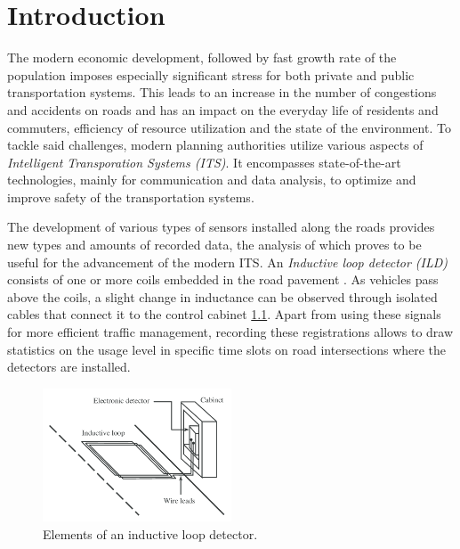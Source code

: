 
\chapter{Introduction}

The modern economic development, followed by fast growth rate of the population
imposes especially significant stress for both private and public transportation
systems. This leads to an increase in the number of congestions and accidents 
on roads and has an impact on the everyday life of residents and commuters,
efficiency of resource utilization and the state of the environment. To tackle
said challenges, modern planning authorities utilize various aspects of
\textit{Intelligent Transporation Systems (ITS)}. It encompasses
state-of-the-art technologies, mainly for communication and data analysis, to
optimize and improve safety of the transportation systems.

The development of various types of sensors installed along the roads provides
new types and amounts of recorded data, the analysis of which proves to be
useful for the advancement of the modern ITS. An \textit{Inductive loop detector
(ILD)} consists of one or more coils embedded in the road pavement
\cite{Lamas.2016}. As vehicles pass above the coils, a slight change in
inductance can be observed through isolated cables that connect it to the
control cabinet \ref{fig:loop-detector}. Apart from using these signals for more
efficient traffic management, recording these registrations allows to draw
statistics on the usage level in specific time slots on road intersections where
the detectors are installed.

\begin{figure}
	\includegraphics[width=0.5\textwidth,height=\textheight,keepaspectratio]{img/Elements-of-an-inductive-loop-detector.png}
	\centering
	\caption{Elements of an inductive loop detector. \cite{Lamas.2016}}
	\label{fig:loop-detector}
\end{figure}

